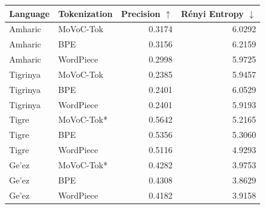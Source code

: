 \begin{tabular}{llrr}
\hline
Language & Tokenization & Precision $\uparrow$ & R\'enyi Entropy $\downarrow$ \\
\hline
Amharic & MoVoC-Tok & 0.3174 & 6.0292 \\
Amharic & BPE & 0.3156 & 6.2159 \\
Amharic & WordPiece & 0.2998 & 5.9725 \\
Tigrinya & MoVoC-Tok & 0.2385 & 5.9457 \\
Tigrinya & BPE & 0.2401 & 6.0529 \\
Tigrinya & WordPiece & 0.2401 & 5.9193 \\
Tigre & MoVoC-Tok* & 0.5642 & 5.2165 \\
Tigre & BPE & 0.5356 & 5.3060 \\
Tigre & WordPiece & 0.5116 & 4.9293 \\
Ge'ez & MoVoC-Tok* & 0.4282 & 3.9753 \\
Ge'ez & BPE & 0.4308 & 3.8629 \\
Ge'ez & WordPiece & 0.4182 & 3.9158 \\
\hline
\end{tabular}
